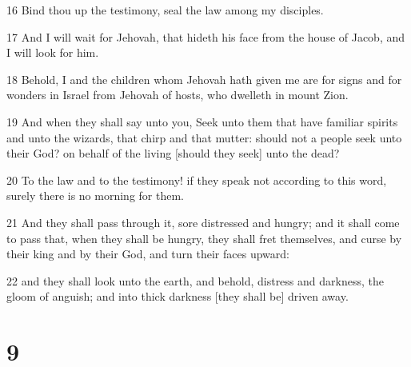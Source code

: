 \par 16 Bind thou up the testimony, seal the law among my disciples.
\par 17 And I will wait for Jehovah, that hideth his face from the house of Jacob, and I will look for him.
\par 18 Behold, I and the children whom Jehovah hath given me are for signs and for wonders in Israel from Jehovah of hosts, who dwelleth in mount Zion.
\par 19 And when they shall say unto you, Seek unto them that have familiar spirits and unto the wizards, that chirp and that mutter: should not a people seek unto their God? on behalf of the living [should they seek] unto the dead?
\par 20 To the law and to the testimony! if they speak not according to this word, surely there is no morning for them.
\par 21 And they shall pass through it, sore distressed and hungry; and it shall come to pass that, when they shall be hungry, they shall fret themselves, and curse by their king and by their God, and turn their faces upward:
\par 22 and they shall look unto the earth, and behold, distress and darkness, the gloom of anguish; and into thick darkness [they shall be] driven away.

\chapter{9}

